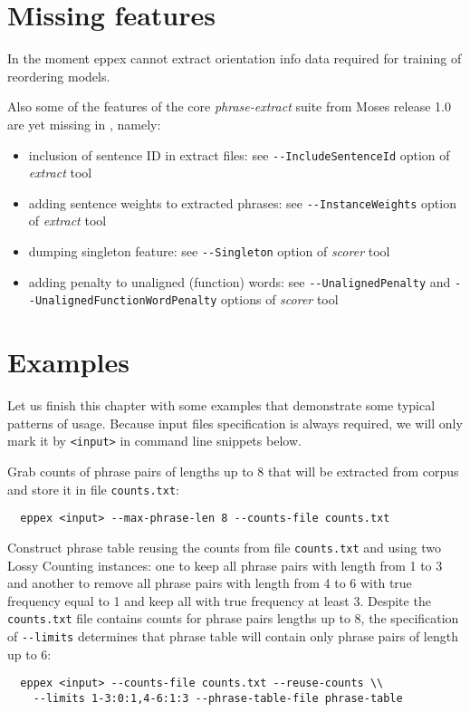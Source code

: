 \section{Missing features}

In the moment eppex cannot extract orientation info data required for training
of reordering models.

Also some of the features of the core \emph{phrase-extract} suite from Moses
release 1.0 are yet missing in \eppex{}, namely:
\begin{itemize}
  \item inclusion of sentence ID in extract files: see \verb|--IncludeSentenceId|
    option of \emph{extract} tool
  \item adding sentence weights to extracted phrases: see \verb|--InstanceWeights|
    option of \emph{extract} tool
  \item dumping singleton feature: see \verb|--Singleton| option of \emph{scorer} tool
  \item adding penalty to unaligned (function) words: see \verb|--UnalignedPenalty|
    and \verb|--UnalignedFunctionWordPenalty| options of \emph{scorer} tool
\end{itemize}

\section{Examples}

Let us finish this chapter with some examples that demonstrate some typical
patterns of \eppex{} usage. Because input files specification is always required,
we will only mark it by \verb|<input>| in command line snippets below.

Grab counts of phrase pairs of lengths up to 8 that will be extracted from
corpus and store it in file \texttt{counts.txt}:
\begin{verbatim}
  eppex <input> --max-phrase-len 8 --counts-file counts.txt
\end{verbatim}

Construct phrase table reusing the counts from file \texttt{counts.txt} and using
two Lossy Counting instances: one to keep all phrase pairs with length from
1 to 3 and another to remove all phrase pairs with length from 4 to 6 with true
frequency equal to 1 and keep all with true frequency at least 3. Despite the
\texttt{counts.txt} file contains counts for phrase pairs lengths up to 8,
the specification of \verb|--limits| determines that phrase table will contain
only phrase pairs of length up to 6:
\begin{verbatim}
  eppex <input> --counts-file counts.txt --reuse-counts \\
    --limits 1-3:0:1,4-6:1:3 --phrase-table-file phrase-table
\end{verbatim}

